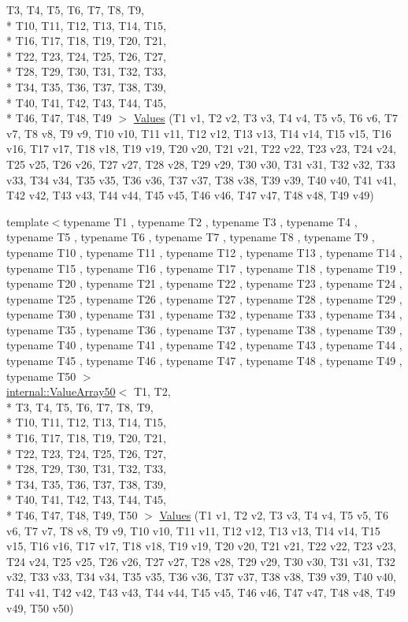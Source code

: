 \begin{DoxyCompactItemize}
T3, T4, T5, T6, T7, T8, T9, \\*
T10, T11, T12, T13, T14, T15, \\*
T16, T17, T18, T19, T20, T21, \\*
T22, T23, T24, T25, T26, T27, \\*
T28, T29, T30, T31, T32, T33, \\*
T34, T35, T36, T37, T38, T39, \\*
T40, T41, T42, T43, T44, T45, \\*
T46, T47, T48, T49 $>$ \hyperlink{namespacetesting_a034785cd0f04e5f5ec9e16c1cad5ccde}{Values} (T1 v1, T2 v2, T3 v3, T4 v4, T5 v5, T6 v6, T7 v7, T8 v8, T9 v9, T10 v10, T11 v11, T12 v12, T13 v13, T14 v14, T15 v15, T16 v16, T17 v17, T18 v18, T19 v19, T20 v20, T21 v21, T22 v22, T23 v23, T24 v24, T25 v25, T26 v26, T27 v27, T28 v28, T29 v29, T30 v30, T31 v31, T32 v32, T33 v33, T34 v34, T35 v35, T36 v36, T37 v37, T38 v38, T39 v39, T40 v40, T41 v41, T42 v42, T43 v43, T44 v44, T45 v45, T46 v46, T47 v47, T48 v48, T49 v49)
\item 
{\footnotesize template$<$typename T1 , typename T2 , typename T3 , typename T4 , typename T5 , typename T6 , typename T7 , typename T8 , typename T9 , typename T10 , typename T11 , typename T12 , typename T13 , typename T14 , typename T15 , typename T16 , typename T17 , typename T18 , typename T19 , typename T20 , typename T21 , typename T22 , typename T23 , typename T24 , typename T25 , typename T26 , typename T27 , typename T28 , typename T29 , typename T30 , typename T31 , typename T32 , typename T33 , typename T34 , typename T35 , typename T36 , typename T37 , typename T38 , typename T39 , typename T40 , typename T41 , typename T42 , typename T43 , typename T44 , typename T45 , typename T46 , typename T47 , typename T48 , typename T49 , typename T50 $>$ }\\\hyperlink{classtesting_1_1internal_1_1_value_array50}{internal\-::\-Value\-Array50}$<$ T1, T2, \\*
T3, T4, T5, T6, T7, T8, T9, \\*
T10, T11, T12, T13, T14, T15, \\*
T16, T17, T18, T19, T20, T21, \\*
T22, T23, T24, T25, T26, T27, \\*
T28, T29, T30, T31, T32, T33, \\*
T34, T35, T36, T37, T38, T39, \\*
T40, T41, T42, T43, T44, T45, \\*
T46, T47, T48, T49, T50 $>$ \hyperlink{namespacetesting_a7b6008393a1fa7b55b07fbad67c1c811}{Values} (T1 v1, T2 v2, T3 v3, T4 v4, T5 v5, T6 v6, T7 v7, T8 v8, T9 v9, T10 v10, T11 v11, T12 v12, T13 v13, T14 v14, T15 v15, T16 v16, T17 v17, T18 v18, T19 v19, T20 v20, T21 v21, T22 v22, T23 v23, T24 v24, T25 v25, T26 v26, T27 v27, T28 v28, T29 v29, T30 v30, T31 v31, T32 v32, T33 v33, T34 v34, T35 v35, T36 v36, T37 v37, T38 v38, T39 v39, T40 v40, T41 v41, T42 v42, T43 v43, T44 v44, T45 v45, T46 v46, T47 v47, T48 v48, T49 v49, T50 v50)

\end{DoxyCompactItemize}
